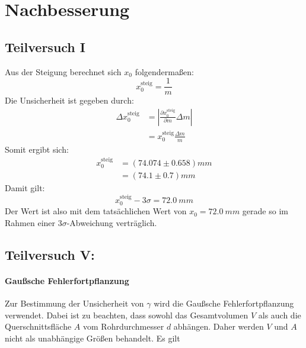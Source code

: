 \documentclass{report}
\begin{document}

\chapter{Nachbesserung}
\section{Teilversuch I}
Aus der Steigung berechnet sich $x_0$ folgendermaßen:
\begin{equation}
    x_0^{\mathrm{steig}} = \frac{1}{m}
\end{equation}
Die Unsicherheit ist gegeben durch:
\begin{equation}
    \begin{split}
        \Delta x_0^{\mathrm{steig}} &= \left\lvert \frac{\partial x_0^{\mathrm{steig}}}{\partial m} \Delta m \right\rvert \\
                                    &= x_0^{\mathrm{steig}} \frac{\Delta m}{m}
    \end{split}
\end{equation}
Somit ergibt sich:
\begin{equation}
    \begin{split}
        x_0^{\mathrm{steig}} &= (74.074 \pm 0.658) \si{mm} \\
                                &= (74.1 \pm 0.7) \si{mm}
    \end{split}
\end{equation}
Damit gilt:
\begin{equation}
    x_0^{\mathrm{steig}} - 3\sigma = \qty{72.0}{mm}
\end{equation}
Der Wert ist also mit dem tatsächlichen Wert von $x_0 = \qty{72.0}{mm}$ gerade so im Rahmen einer $3\sigma$-Abweichung verträglich.


\section{Teilversuch V:}
\subsubsection{Gaußsche Fehlerfortpflanzung}
\noindent
Zur Bestimmung der Unsicherheit von $\gamma$ wird die Gaußsche
Fehlerfortpflanzung verwendet. Dabei ist zu beachten, dass sowohl das
Gesamtvolumen $V$ als auch die Querschnittsfläche $A$ vom Rohrdurchmesser $d$
abhängen. Daher werden $V$ und $A$ nicht als unabhängige Größen behandelt.
\noindent
Es gilt
\end{document}

